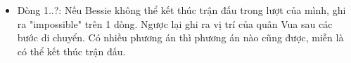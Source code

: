\begin{itemize}
	\item     Dòng 1..?: Nếu Bessie không thể kết thúc trận đấu trong lượt của mình, ghi ra         "impossible" trên 1 dòng. Ngược lại ghi ra vị trí của quân Vua sau các bước         di chuyển. Có nhiều phương án thì phương án nào cũng được, miễn là          có thể kết thúc trận đấu.   
\end{itemize}